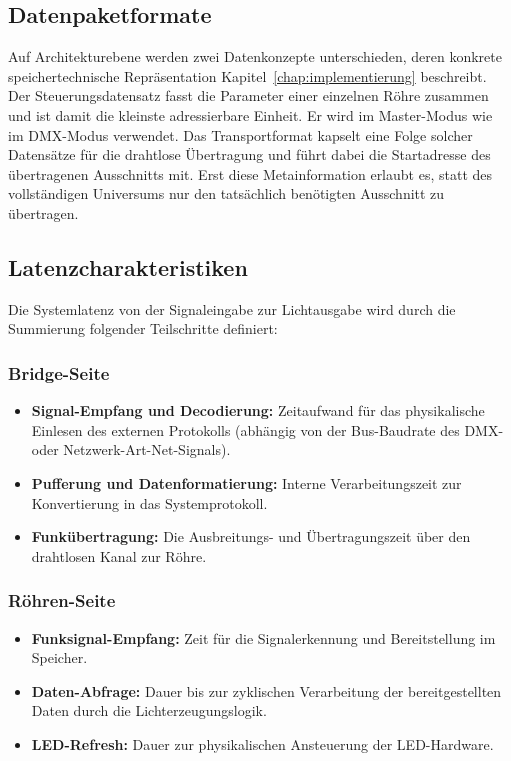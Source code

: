 \subsection{Datenpaketformate}
\label{subsec:datenpaketformate}

Auf Architekturebene werden zwei Datenkonzepte unterschieden, deren konkrete
speichertechnische Repräsentation Kapitel~\ref{chap:implementierung} beschreibt. Der
Steuerungsdatensatz fasst die Parameter einer einzelnen Röhre zusammen und ist damit die
kleinste adressierbare Einheit. Er wird im Master-Modus wie im DMX-Modus verwendet. Das
Transportformat kapselt eine Folge solcher Datensätze für die drahtlose Übertragung und
führt dabei die Startadresse des übertragenen Ausschnitts mit. Erst diese
Metainformation erlaubt es, statt des vollständigen Universums nur den tatsächlich
benötigten Ausschnitt zu übertragen.

\subsection{Latenzcharakteristiken}
\label{subsec:latenzcharakteristiken}

Die Systemlatenz von der Signaleingabe zur Lichtausgabe wird durch die Summierung 
folgender Teilschritte definiert:

\subsubsection{Bridge-Seite}

\begin{itemize}
    \item \textbf{Signal-Empfang und Decodierung:} Zeitaufwand für das physikalische Einlesen 
    des externen Protokolls (abhängig von der Bus-Baudrate des DMX- oder Netzwerk-Art-Net-Signals).
    \item \textbf{Pufferung und Datenformatierung:} Interne Verarbeitungszeit zur Konvertierung in das Systemprotokoll.
    \item \textbf{Funkübertragung:} Die Ausbreitungs- und Übertragungszeit über den drahtlosen Kanal zur Röhre.
\end{itemize}

\subsubsection{Röhren-Seite}

\begin{itemize}
    \item \textbf{Funksignal-Empfang:} Zeit für die Signalerkennung und Bereitstellung im Speicher.
    \item \textbf{Daten-Abfrage:} Dauer bis zur zyklischen Verarbeitung der bereitgestellten Daten durch die Lichterzeugungslogik.
    \item \textbf{LED-Refresh:} Dauer zur physikalischen Ansteuerung der LED-Hardware.
\end{itemize}

